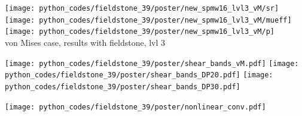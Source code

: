 \begin{center}
\texttt{[image: python\_codes/fieldstone\_39/poster/new\_spmw16\_lvl3\_vM/sr]}
\texttt{[image: python\_codes/fieldstone\_39/poster/new\_spmw16\_lvl3\_vM/mueff]}
\texttt{[image: python\_codes/fieldstone\_39/poster/new\_spmw16\_lvl3\_vM/p]}\\
{\small von Mises case, results with fieldstone, lvl 3}
\end{center}


\texttt{[image: python\_codes/fieldstone\_39/poster/shear\_bands\_vM.pdf]}
\texttt{[image: python\_codes/fieldstone\_39/poster/shear\_bands\_DP20.pdf]}
\texttt{[image: python\_codes/fieldstone\_39/poster/shear\_bands\_DP30.pdf]}

\texttt{[image: python\_codes/fieldstone\_39/poster/nonlinear\_conv.pdf]}

